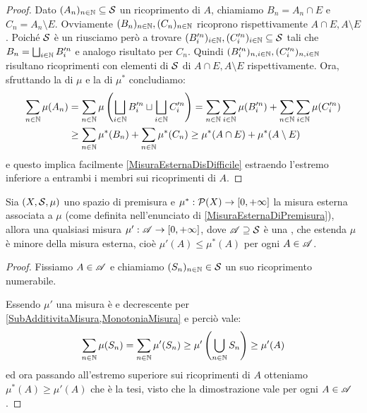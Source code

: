 \begin{proof}
	Dato $(A_n)_{n\in\N}\subseteq\S$ un ricoprimento di $A$, chiamiamo $B_n=A_n\cap E$ e $C_n=A_n\setminus E$. Ovviamente $(B_n)_{n\in\N},(C_n)_{n\in\N}$ ricoprono rispettivamente $A\cap E,A\setminus E$. Poiché $\S$ è un \semiring{} riusciamo però a trovare $(B'^n_i)_{i\in\N},(C'^n_i)_{i\in\N} \subseteq \S$ tali che $B_n=\bigsqcup_{i\in\N}B'^n_i$ e analogo risultato per $C_n$. Quindi $(B'^n_i)_{n,i\in\N}, (C'^n_i)_{n,i\in\N}$ risultano ricoprimenti con elementi di $\S$ di $A\cap E,A\setminus E$ rispettivamente.
	Ora, sfruttando la \sigadd[ità] di $\mu$ e la \sigsubadd[ità] di $\mu^*$ concludiamo:
	\begin{align*}
		\sum_{n\in\N}\mu(A_n)&=
		\sum_{n\in\N} \mu\left(\bigsqcup_{i\in\N} B'^n_i\sqcup \bigsqcup_{i\in\N} C'^n_i\right)=
		\sum_{n\in\N}\sum_{i\in\N}\mu(B'^n_i)+\sum_{n\in\N}\sum_{i\in\N}\mu(C'^n_i)\\
		&\ge
		\sum_{n\in\N}\mu^*(B_n)+\sum_{n\in\N}\mu^*(C_n)
		\ge \mu^*(A\cap E)+\mu^*(A\setminus E)
	\end{align*}
	e questo implica facilmente \cref{MisuraEsternaDisDifficile} estraendo l'estremo inferiore a entrambi i membri sui ricoprimenti di $A$.
\end{proof}
\begin{remark}\label{PremisuraMassimaMisura}
	Sia $(X,\S,\mu)$ uno spazio di premisura e $\mu^*:\mathcal P(X)\to\Rpiu$ la misura esterna associata a $\mu$ (come definita nell'enunciato di \cref{MisuraEsternaDiPremisura}), allora una qualsiasi misura $\mu':\A\to\Rpiu$, dove $\A\supseteq \S$ è una \sigalg{}, che estenda $\mu$ è minore della misura esterna, cioè $\mu'(A)\le \mu^*(A)$ per ogni $A\in\A$.
\end{remark}
\begin{proof}
	Fissiamo $A\in\A$ e chiamiamo $(S_n)_{n\in\N}\in\S$ un suo ricoprimento numerabile.
	
	Essendo $\mu'$ una misura è \sigsubadd{} e decrescente per \cref{SubAdditivitaMisura,MonotoniaMisura} e perciò vale:
	\begin{equation*}
		\sum_{n\in\N}\mu(S_n)=\sum_{n\in\N}\mu'(S_n)\ge \mu'\left(\bigcup_{n\in\N}S_n\right)\ge \mu'(A)
	\end{equation*}
	ed ora passando all'estremo superiore sui ricoprimenti di $A$ otteniamo $\mu^*(A)\ge\mu'(A)$ che è la tesi, visto che la dimostrazione vale per ogni $A\in\A$.
\end{proof}



